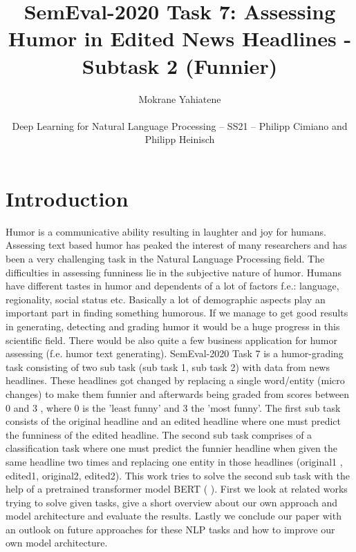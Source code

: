 \documentclass[11pt,a4paper,onecolumn,oneside,notitlepage]{article}
\author{Mokrane Yahiatene\\
	\begin{small}
		Deep Learning for Natural Language Processing -- SS21 -- Philipp Cimiano and Philipp Heinisch
	\end{small}
}
\title{SemEval-2020 Task 7: Assessing Humor in Edited
	News Headlines - Subtask 2 (Funnier)}
\begin{document}
	\maketitle
	
	\section{Introduction}
		Humor is a communicative ability resulting in laughter and joy for humans. Assessing text based humor has peaked the interest of many researchers and has been a very challenging task in the Natural Language Processing field.
		The difficulties in assessing funniness lie in the subjective nature of humor. Humans have different tastes in humor and dependents of a lot of factors  f.e.: language, regionality, social status etc.
		Basically a lot of demographic aspects play an important part in finding something humorous.
		If we manage to get good results in generating, detecting and grading humor it would be a huge progress in this scientific field. There would be also quite a few business application for humor assessing (f.e. humor text generating).
		SemEval-2020 Task 7 is a humor-grading task consisting of two sub task (sub task 1, sub task 2) with data from news headlines. These headlines got changed by replacing a single word/entity (micro changes) to make them funnier and afterwards being graded from scores between 0 and 3 , where 0 is the 'least funny' and 3 the 'most funny'.
		The first sub task consists of the original headline and an edited headline where one must predict the funniness of the edited headline.
		The second sub task comprises of a classification task where one must predict the funnier headline when given the same headline  two times and replacing one entity in those headlines (original1 , edited1, original2, edited2).
		This work tries to solve the second sub task with the help of a pretrained transformer model BERT ( \textcite{BertPaper} ).
		First we look at related works trying to solve given tasks, give a short overview about our own approach and model architecture and evaluate the results. Lastly we conclude our paper with an outlook on future  approaches for these NLP tasks and how to improve our own model architecture.
		
		
\end{document}
